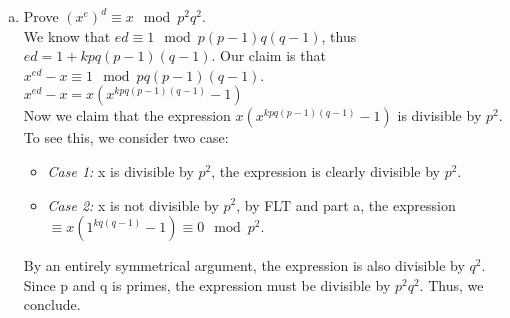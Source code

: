 \documentclass{article}
\begin{document}
\begin{enumerate}[(a).]
    \item Prove $(x^e)^d \equiv x \mod{p^2q^2}$.\\
    We know that $ed \equiv 1 \mod{p(p-1)q(q-1)}$, thus 
    $ed = 1 + kpq(p-1)(q-1)$. Our claim is that $x^{ed} - x \equiv 1 \mod{pq(p-1)(q-1)}$. \\
    
    $x^{ed} - x = x(x^{kpq(p-1)(q-1)} - 1)$\\

    Now we claim that the expression $x(x^{kpq(p-1)(q-1)} - 1)$ is divisible by $p^2$. 
    To see this, we consider two case: 
    \begin{itemize}
        \item \emph{Case 1: }x is divisible by $p^2$, the expression is clearly divisible by $p^2$. 
        \item \emph{Case 2: }x is not divisible by $p^2$, by FLT and part a, the expression $\equiv x(1^{kq(q-1)} - 1) \equiv 0 \mod{p^2}$.
    \end{itemize}
    By an entirely symmetrical argument, the expression is also divisible by $q^2$. 
    Since p and q is primes, the expression must be divisible by $p^2q^2$. Thus, we conclude.

\end{enumerate}
\end{document}
